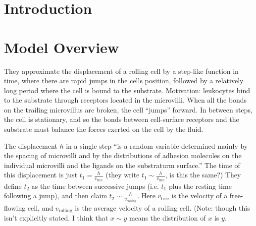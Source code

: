 \documentclass[
10pt, %
letterpaper, %
twocolumn, %
landscape %
]{article}
\begin{document}
\pagestyle{myheadings} %
\markright{\doctitle} %


\thispagestyle{plain} %

\printtitle %


\section{Introduction}




\section{Model Overview}

They approximate the displacement of a rolling cell by a step-like
function in time, where there are rapid jumps in the cells position,
followed by a relatively long period where the cell is bound to the
substrate. Motivation: leukocytes bind to the substrate through
receptors located in the microvilli. When all the bonds on the
trailing microvillus are broken, the cell ``jumps'' forward. In
between steps, the cell is stationary, and so the bonds between
cell-surface receptors and the substrate must balance the forces
exerted on the cell by the fluid.

The displacement $h$ in a single step ``is a random variable
determined mainly by the spacing of microvilli and by the
distributions of adhesion molecules on the individual microvilli and
the ligands on the substraturm surface.'' The time of this
displacement is just $t_1 = \frac{h}{v_\text{free}}$ (they write $t_1
\sim \frac{h}{v_\text{free}}$, is this the same?) They define $t_2$ as
the time between successive jumps (i.e. $t_1$ plus the resting time
following a jump), and then claim $t_2 \sim
\frac{h}{v_\text{rolling}}$. Here $v_\text{free}$ is the velocity of a
free-flowing cell, and $v_\text{rolling}$ is the average velocity of a
rolling cell. (Note: though this isn't explicitly stated, I think that
$x \sim y$ means the distribution of $x$ is $y$. 
\end{document}
